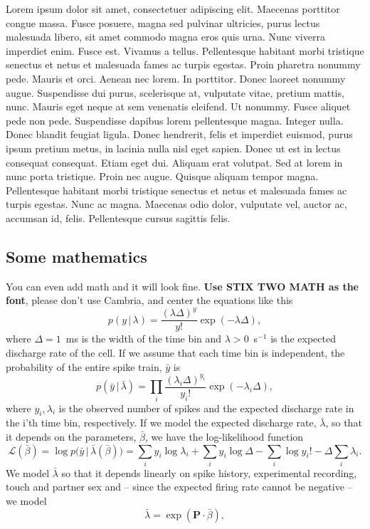 \documentclass{biorxiv}
\begin{document}
\begin{methods}
Lorem ipsum dolor sit amet, consectetuer adipiscing elit. Maecenas porttitor
congue massa. Fusce posuere, magna sed pulvinar ultricies, purus lectus
malesuada libero, sit amet commodo magna eros quis urna. Nunc viverra
imperdiet enim. Fusce est. Vivamus a tellus. Pellentesque habitant morbi
tristique senectus et netus et malesuada fames ac turpis egestas. Proin
pharetra nonummy pede. Mauris et orci. Aenean nec lorem. In porttitor. Donec
laoreet nonummy augue. Suspendisse dui purus, scelerisque at, vulputate vitae,
pretium mattis, nunc. Mauris eget neque at sem venenatis eleifend. Ut nonummy.
Fusce aliquet pede non pede. Suspendisse dapibus lorem pellentesque magna.
Integer nulla. Donec blandit feugiat ligula. Donec hendrerit, felis et
imperdiet euismod, purus ipsum pretium metus, in lacinia nulla nisl eget
sapien. Donec ut est in lectus consequat consequat. Etiam eget dui. Aliquam
erat volutpat. Sed at lorem in nunc porta tristique. Proin nec augue. Quisque
aliquam tempor magna. Pellentesque habitant morbi tristique senectus et netus
et malesuada fames ac turpis egestas. Nunc ac magna. Maecenas odio dolor,
vulputate vel, auctor ac, accumsan id, felis. Pellentesque cursus sagittis
felis.

\subsection{Some mathematics}
You can even add math and it will look fine. \textbf{Use STIX TWO MATH as the
font}, please don't use Cambria, and center the equations like this
\[
  p(y\,|\,\lambda) = \frac{(\lambda\Delta)^{y}}{y!}\exp(-\lambda\Delta),
\]
where $\Delta = 1$~ms is the width of the time bin and $\lambda > 0$~s$^{-1}$
is the expected discharge rate of the cell. If we assume that each time bin is
independent, the probability of the entire spike train, $\bar{y}$ is
\[
  p(\bar{y}\,|\,\bar{\lambda}) = \prod_i \frac{(\lambda_i\Delta)^{y_i}}{y_i!}
  \exp(-\lambda_i\Delta),
\]
where $y_i, \lambda_i$ is the observed number of spikes and the expected
discharge rate in the i'th time bin, respectively. If we model the expected
discharge rate, $\bar{\lambda}$, so that it depends on the parameters,
$\bar{\beta}$, we have the log-likelihood function
\[
  \mathcal{L}(\bar{\beta}) = \log p\bigl(\bar{y}\,|\,\bar{\lambda}(\bar{\beta})\bigr)
  = \textstyle\sum_i y_i\log\lambda_i + \sum_i y_i\log\Delta
  - \sum_i\log y_i! - \Delta\sum_i\lambda_i .
\]
We model $\bar{\lambda}$ so that it depends linearly on spike history,
experimental recording, touch and partner sex and -- since the expected firing
rate cannot be negative -- we model
\[
  \bar{\lambda} = \exp(\mathbf{P}\cdot\bar{\beta}),
\]


\end{methods}
\end{document}
